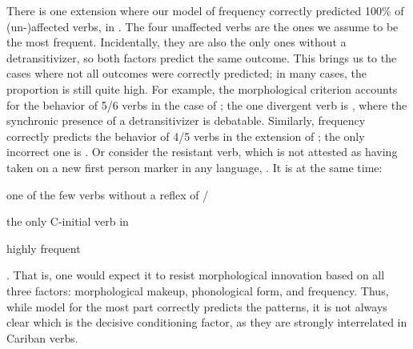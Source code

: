 There is one extension where our model of frequency correctly predicted 100\% of (un-)affected verbs, in \PWai.
The four unaffected  verbs are the ones we assume to be the most frequent.
Incidentally, they are also the only ones without a detransitivizer, so both factors predict the same outcome.
This brings us to the cases where not all outcomes were correctly predicted; in many cases, the proportion is still quite high.
For example, the morphological criterion accounts for the behavior of 5/6 verbs in the case of \PTir; the one divergent verb is  , where the synchronic presence of a detransitivizer is debatable.
Similarly, frequency correctly predicts the behavior of 4/5 verbs in the extension of \carijo {}; the only incorrect one is  .
Or consider the  resistant verb, which is not attested as having taken on a new first person marker in any language,  .
It is at the same time: \begin{inlinelist}
	\item one of the few  verbs without a reflex of /
	\item the only C-initial  verb in \PC
	\item highly frequent
\end{inlinelist}.
That is, one would expect it to resist morphological innovation based on all three factors: morphological makeup, phonological form, and frequency.
Thus, while  model for the most part correctly predicts the patterns, it is not always clear which is the decisive conditioning factor, as they are strongly interrelated in Cariban  verbs.



%


